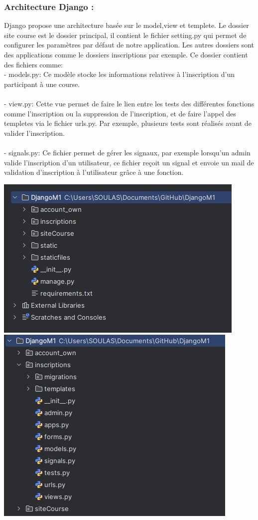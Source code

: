 \documentclass[12pt]{article} %
\begin{document}
		\subsubsection{Architecture Django :} 
            Django propose une architecture basée sur le model,view et templete.  Le dossier site course est le dossier principal, il contient le fichier setting.py qui permet de configurer les paramètres par défaut de notre application. Les autres dossiers sont des applications comme le dossiers inscriptions par exemple. Ce dossier contient des fichiers comme: \\
            - models.py:  Ce modèle stocke les informations relatives à l'inscription d'un participant à une course. \\ \\
            - view.py: Cette vue permet de faire le lien entre les tests des différentes fonctions comme l’inscription ou la suppression de l’inscription, et de faire l'appel des templetes via le fichier urls.py. Par exemple, plusieurs tests sont réalisés avant de valider l'inscription. \\ \\
            - signals.py: Ce fichier permet de gérer les signaux, par exemple lorsqu'un admin valide l’inscription d’un utilisateur, ce fichier reçoit un signal et envoie un mail de validation d'inscription à l’utilisateur grâce à une fonction.

            \includegraphics[scale=0.6]{images/Capture_structure.PNG}
            \includegraphics[scale=0.6]{images/Capture_structure-inscription.PNG}
\end{document}

